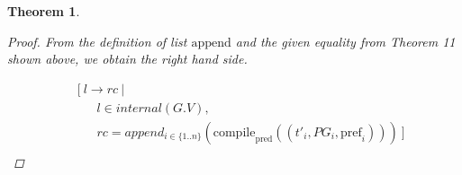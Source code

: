 \documentclass[twocolumn, openany]{sig-alternate-10pt}
\newcommand{\CompilePred}{\ensuremath{\mathrm{compile}_\mathrm{pred}}}
\newcommand{\Pref}{\ensuremath{\mathrm{pref}}}
\newtheorem{thm}{Theorem}
\begin{document}
\begin{thm}
\begin{proof}
    \noindent
    From the definition of list $\mathrm{append}$ and the given equality from Theorem 11 shown above, we obtain the right hand side.

    \[ \begin{array}{l}
     ~~~~~ [~ l \rightarrow rc ~\vert~ \\
     ~~~~~~~~~~~~ l \in internal(G.V), \\ 
     ~~~~~~~~~~~~ rc = append_{i \in \{1..n\}}(\CompilePred((t'_i, PG_i, \Pref_i))) ~] \\
    \end{array} \]%


  \end{proof}

\end{thm}
\end{document}
